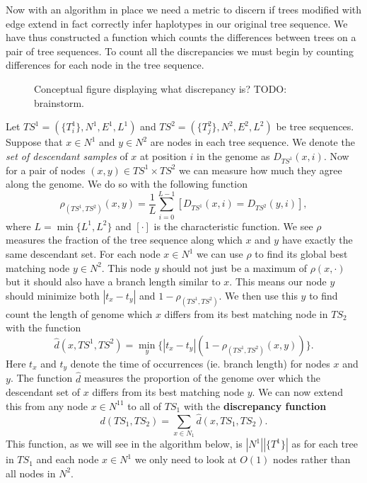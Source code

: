 \documentclass[10pt,twoside,lineno]{gsajnl}
\begin{document}
\par Now with an algorithm in place
 we need a metric to discern
 if trees modified with edge extend
 in fact correctly infer haplotypes in our original tree sequence.
 We have thus constructed a function which counts the differences 
 between trees on a pair of tree sequences. 
 To count all the discrepancies we must begin by counting differences for each node in the tree sequence.

\begin{figure}
    \caption{
        Conceptual figure displaying what discrepancy is?
        TODO: brainstorm.
        \label{fig:conceptual_discrepancy}
    }
\end{figure}

 Let $TS^1=(\{T_i^1\},N^1,E^1,L^1)$ and $TS^2=(\{T^2_j\},N^2,E^2,L^2)$ be tree sequences.
 Suppose that $x\in N^1$ and $y\in N^2$ are nodes in each tree sequence.
 We denote the \textit{set of descendant samples} of $x$ at position $i$ in the genome as $D_{TS^1}(x,i)$.
 Now for a pair of nodes $(x,y)\in TS^1\times TS^2$ 
 we can measure how much they agree along the genome.
 We do so with the following function
 $$\rho_{(TS^1,TS^2)}(x,y)=\frac{1}{L}\sum_{i=0}^{L-1}[D_{TS^1}(x,i)=D_{TS^2}(y,i)],$$
 where $L=\min\{L^1,L^2\}$ and $[\cdot]$ is the characteristic function. 
 We see $\rho$ measures the fraction of the tree sequence
 along which $x$ and $y$ have exactly the same descendant set. 
 For each node $x\in N^1$ we can use $\rho$ to find its global best matching node $y\in N^2$. 
 This node $y$ should not just be a maximum of $\rho(x,\cdot)$ but it should also have a branch length similar to $x$. 
 This means our node $y$ should minimize both $|t_x-t_y|$ and $1-\rho_{(TS^1,TS^2)}$.
 We then use this $y$ to find count the length of genome which $x$ differs from its best matching node in $TS_2$ with the function
 $$\hat{d}(x,TS^1,TS^2)=\min_y\{|t_x-t_y|(1-\rho_{(TS^1,TS^2)}(x,y))\}.$$
 Here $t_x$ and $t_y$ denote the time of occurrences (ie. branch length) for nodes $x$ and $y$. 
 The function $\hat{d}$ measures the proportion of the genome 
 over which the descendant set of $x$ differs from its best matching node $y$.
 We can now extend this from any node $x\in N^11$ to all of $TS_1$ with the \textbf{discrepancy function}
 $$d(TS_1,TS_2)=\sum_{x\in N_1}\hat{d}(x,TS_1,TS_2).$$
 This function, as we will see in the algorithm below,
 is $|N^1||\{T^1\}|$ as for each tree in $TS_1$ and each node $x\in N^1$ we only need to look at $O(1)$ nodes rather than all nodes in $N^2$.
 
\end{document}
